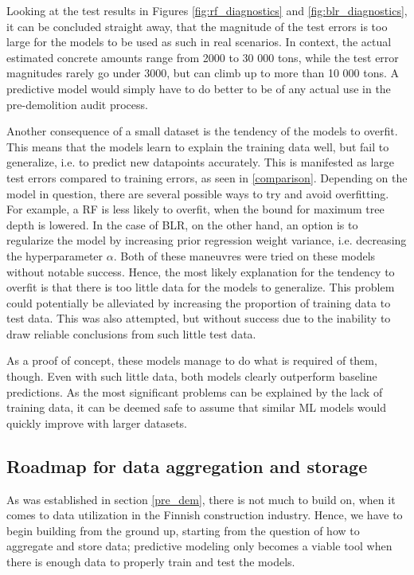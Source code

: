 \documentclass[english, 12pt, a4paper, sci, utf8, a-2b, online]{aaltothesis}
\begin{document}
Looking at the test results in Figures \ref{fig:rf_diagnostics} and \ref{fig:blr_diagnostics}, it can be concluded straight away, that the magnitude of the test errors is too large for the models
to be used as such in real scenarios. In context, the actual estimated concrete amounts range from 2000 to 30 000 tons, while the test error magnitudes rarely go under 3000, but can climb up to
more than 10 000 tons. A predictive model would simply have to do better to be of any actual use in the pre-demolition audit process.

Another consequence of a small dataset is the tendency of the models to overfit. This means that the models learn to explain the training data well, but fail to generalize, i.e. to predict new
datapoints accurately. This is manifested as large test errors compared to training errors, as seen in \ref{comparison}. Depending on the model in question, there are several possible ways to try and avoid
overfitting. For example, a RF is less likely to overfit, when the bound for maximum tree depth is lowered. In the case of BLR, on the other hand, an option is to regularize the model by increasing
prior regression weight variance, i.e. decreasing the hyperparameter $\alpha$. Both of these maneuvres were tried on these models without notable success. Hence, the most likely explanation for
the tendency to overfit is that there is too little data for the models to generalize. This problem could potentially be alleviated by increasing the proportion of training data to test data.
This was also attempted, but without success due to the inability to draw reliable conclusions from such little test data.

As a proof of concept, these models manage to do what is required of them, though. Even with such little data, both models clearly outperform baseline predictions. As the most significant problems
can be explained by the lack of training data, it can be deemed safe to assume that similar ML models would quickly improve with larger datasets.

\subsection{Roadmap for data aggregation and storage} \label{aggregation}

As was established in section \ref{pre_dem}, there is not much to build on, when it comes to data utilization in the Finnish construction industry. Hence, we have to begin building from the
ground up, starting from the question of how to aggregate and store data; predictive modeling only becomes a viable tool when there is enough data to properly train and test the models.
\end{document}
